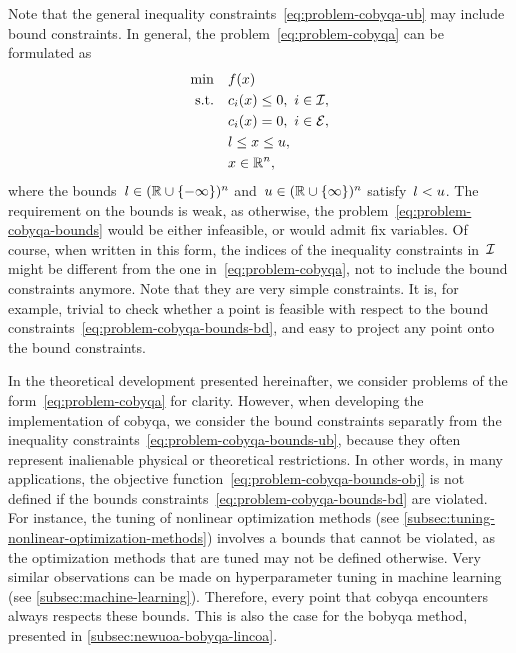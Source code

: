 Note that the general inequality constraints~\cref{eq:problem-cobyqa-ub} may include bound constraints.
In general, the problem~\cref{eq:problem-cobyqa} can be formulated as
\begin{subequations}
    \label{eq:problem-cobyqa-bounds}
    \begin{align}
        \min        & \quad \obj(\iter) \label{eq:problem-cobyqa-bounds-obj}\\
        \text{s.t.} & \quad \con{i}(\iter) \le 0, ~ i \in \iub, \label{eq:problem-cobyqa-bounds-ub}\\
                    & \quad \con{i}(\iter) = 0, ~ i \in \ieq,\\
                    & \quad \xl \le x \le \xu, \label{eq:problem-cobyqa-bounds-bd}\\
                    & \quad \iter \in \R^n, \nonumber
    \end{align}
\end{subequations}
where the bounds~$l \in (\mathbb{R} \cup \{-\infty\})^n$ and~$u \in (\mathbb{R} \cup \{\infty\})^n$ satisfy~$l < u$.
The requirement on the bounds is weak, as otherwise, the problem~\cref{eq:problem-cobyqa-bounds} would be either infeasible, or would admit fix variables.
Of course, when written in this form, the indices of the inequality constraints in~$\mathcal{I}$ might be different from the one in~\cref{eq:problem-cobyqa}, not to include the bound constraints anymore.
Note that they are very simple constraints.
It is, for example, trivial to check whether a point is feasible with respect to the bound constraints~\cref{eq:problem-cobyqa-bounds-bd}, and easy to project any point onto the bound constraints.

In the theoretical development presented hereinafter, we consider problems of the form~\cref{eq:problem-cobyqa} for clarity.
However, when developing the implementation of \gls{cobyqa}, we consider the bound constraints separatly from the inequality constraints~\cref{eq:problem-cobyqa-bounds-ub}, because they often represent inalienable physical or theoretical restrictions.
In other words, in many applications, the objective function~\cref{eq:problem-cobyqa-bounds-obj} is not defined if the bounds constraints~\cref{eq:problem-cobyqa-bounds-bd} are violated.
For instance, the tuning of nonlinear optimization methods (see \cref{subsec:tuning-nonlinear-optimization-methods}) involves a bounds that cannot be violated, as the optimization methods that are tuned may not be defined otherwise.
Very similar observations can be made on hyperparameter tuning in machine learning (see \cref{subsec:machine-learning}).
Therefore, every point that \gls{cobyqa} encounters always respects these bounds.
This is also the case for the \gls{bobyqa} method, presented in \cref{subsec:newuoa-bobyqa-lincoa}.

